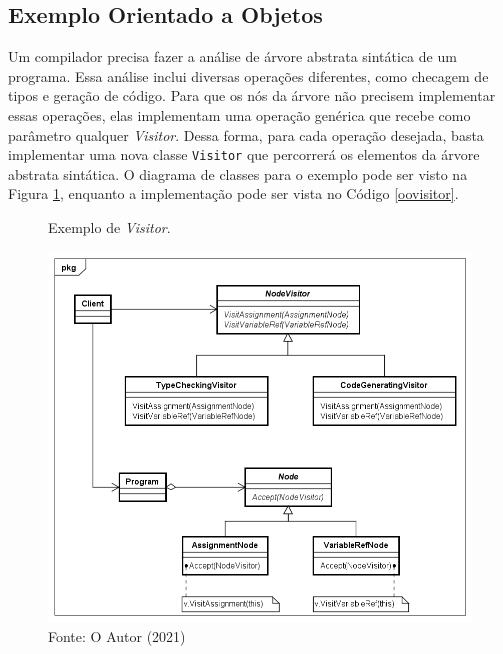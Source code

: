 \subsection*{Exemplo Orientado a Objetos}

Um compilador precisa fazer a análise de árvore abstrata sintática de 
um programa. Essa análise inclui diversas operações diferentes, como 
checagem de tipos e geração de código. Para que os nós da árvore 
não precisem implementar essas operações, elas implementam uma operação 
genérica que recebe como parâmetro qualquer \textit{Visitor}. Dessa 
forma, para 
cada operação desejada, basta implementar uma nova classe 
\texttt{Visitor} 
que percorrerá os elementos da árvore abstrata sintática. O diagrama 
de classes para o exemplo pode ser visto na Figura \ref{visitor_exemplo1}, 
enquanto a implementação pode ser vista no Código \ref{oovisitor}.

\begin{figure}[htb]
	\caption{\label{visitor_exemplo1}Exemplo de \textit{Visitor}.}
	\begin{center}
	    \includegraphics[scale=0.5]{5_padroes-contexto-funcional/5.3_comportamentais/5.3.11_visitor/visitor_exemplo.png}
	\end{center}
  \caption*{Fonte: O Autor (2021)}
\end{figure}

